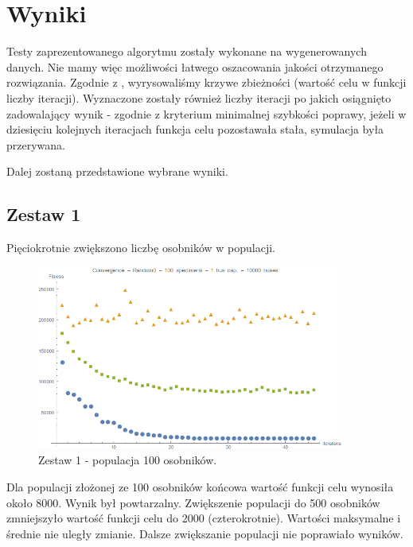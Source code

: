 \documentclass[polish,12pt]{aghthesis}
\begin{document}
\newpage




\section{Wyniki}
Testy zaprezentowanego algorytmu zostały wykonane na wygenerowanych danych. Nie mamy więc możliwości łatwego oszacowania jakości otrzymanego rozwiązania. Zgodnie z \cite{bib-metody-intobl}, wyrysowaliśmy krzywe zbieżności (wartość celu w funkcji liczby iteracji). Wyznaczone zostały również liczby iteracji po jakich osiągnięto zadowalający wynik - zgodnie z kryterium minimalnej szybkości poprawy,	jeżeli w dziesięciu kolejnych iteracjach funkcja celu pozostawała stała, symulacja była przerywana.

Dalej zostaną przedstawione wybrane wyniki.

\subsection{Zestaw 1}
Pięciokrotnie zwiększono liczbę osobników w populacji.

\begin{figure}[!htbp]
	\centering
	\includegraphics[width=0.9\textwidth]{convRandom0Spec100Bc1Bus10000}
	\caption{Zestaw 1 - populacja 100 osobników.}
\end{figure}

Dla populacji złożonej ze 100 osobników końcowa wartość funkcji celu wynosiła około 8000. Wynik był powtarzalny. Zwiększenie populacji do 500 osobników zmniejszyło wartość funkcji celu do 2000 (czterokrotnie). Wartości maksymalne i średnie nie uległy zmianie. Dalsze zwiększanie populacji nie poprawiało wyników.
\end{document}
